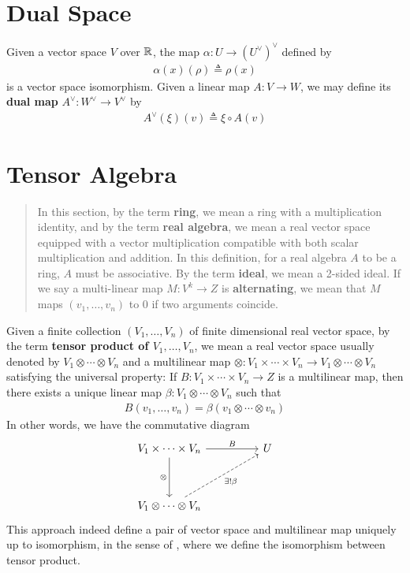 \documentclass{report}
\begin{document}
\section{Dual Space}
\begin{mdframed}
Given a vector space $V$ over  $\mathbb{R}$, the map  $\alpha :U\rightarrow (U^\vee)^{\vee}$ defined by 
\begin{align*}
\alpha (x)(\rho)\triangleq \rho (x)
\end{align*}
is a vector space isomorphism. Given a linear map $A:V\rightarrow W$, we may define its \textbf{dual map} $A^\vee:W^{\vee}\rightarrow V^{\vee}$ by 
\begin{align*}
A^{\vee}(\xi)(v)\triangleq \xi \circ A(v) 
\end{align*}
\end{mdframed}
\section{Tensor Algebra}
\begin{abstract}
In this section, by the term \textbf{ring}, we mean a ring with a multiplication identity, and by the term \textbf{real algebra}, we mean a real vector space equipped with a vector multiplication compatible with both scalar multiplication and addition. In this definition, for a real algebra $A$ to be a ring, $A$ must be associative.  By the term \textbf{ideal}, we mean a 2-sided ideal. If we say a multi-linear map $M:V^k\rightarrow Z$ is \textbf{alternating}, we mean that $M$ maps $(v_1,\dots ,v_n)$ to $0$ if two arguments coincide.
\end{abstract}
\begin{mdframed}
Given a finite collection $(V_1,\dots ,V_n)$ of finite dimensional real vector space, by the term \textbf{tensor product of $V_1,\dots ,V_n$}, we mean a real vector space  usually denoted by $V_1 \otimes \cdots \otimes  V_n$ and a multilinear map  $\otimes  : V_1 \times \cdots \times V_n \rightarrow V_1 \otimes  \cdots \otimes  V_n$ satisfying the universal property: If $B:V_1 \times \cdots \times V_n\rightarrow Z$ is a multilinear map, then there exists a unique linear map $\beta :V_1\otimes \cdots \otimes  V_n$ such that 
\begin{align*}
B(v_1,\dots ,v_n)=\beta (v_1\otimes \cdots \otimes  v_n)
\end{align*}
In other words, we have the commutative diagram
\[\begin{tikzcd}
	{V_1\times \cdots \times V_n} && U \\
	\\
	{V_1 \otimes \cdots \otimes   V_n}
	\arrow["B", from=1-1, to=1-3] 
	\arrow["{\otimes }"', from=1-1, to=3-1]
	\arrow["{\exists! \beta}"', dashed, from=3-1, to=1-3]
\end{tikzcd}\]
This approach indeed define a pair of vector space and multilinear map uniquely up to isomorphism, in the sense of , where we define the isomorphism between tensor product. 
\end{mdframed}
\end{document}
